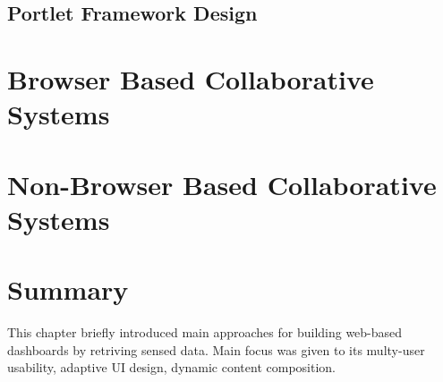 \subsection{Portlet Framework Design}

\section{Browser Based Collaborative Systems}

\section{Non-Browser Based Collaborative Systems}

\section{Summary}
This chapter briefly introduced main approaches for building web-based dashboards by retriving sensed data. Main focus was given to its multy-user usability, adaptive UI design, dynamic content composition.
